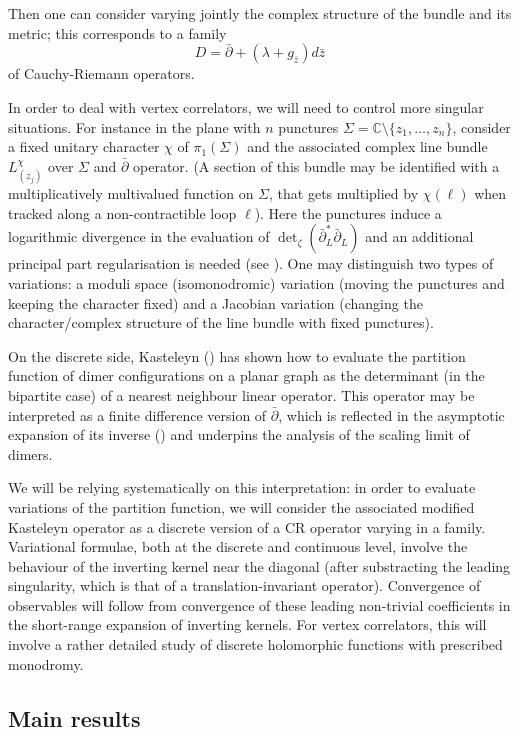 \documentclass[10pt]{article}
\newcommand{\C}{\mathbb{C}}
\newcommand{\dbar}{\bar\partial}
\begin{document}
Then one can consider varying jointly the complex structure of the bundle and its metric; this corresponds to a family
$$D=\dbar+(\lambda+g_{\bar z})d\bar z$$
of Cauchy-Riemann operators. 

In order to deal with vertex correlators, we will need to control more singular situations. For instance in the plane with $n$ punctures $\Sigma=\C\setminus\{z_1,\dots,z_n\}$, consider a fixed unitary character $\chi$ of $\pi_1(\Sigma)$ and the associated complex line bundle $L_{(z_j)}^\chi$ over $\Sigma$ and $\dbar$ operator. (A section of this bundle may be identified with a multiplicatively multivalued function on $\Sigma$, that gets multiplied by $\chi(\ell)$ when tracked along a non-contractible loop $\ell$). 
Here the punctures induce a logarithmic divergence in the evaluation of $\det_\zeta(\dbar_L^*\dbar_L)$ and an additional principal part regularisation is needed (see \cite{Palmer_CR}). One may distinguish two types of variations: a moduli space (isomonodromic) variation (moving the punctures and keeping the character fixed) and a Jacobian variation (changing the character/complex structure of the line bundle with fixed punctures). 

On the discrete side, Kasteleyn (\cite{Kas_square}) has shown how to evaluate the partition function of dimer configurations on a planar graph as the determinant (in the bipartite case) of a nearest neighbour linear operator. This operator may be interpreted as a finite difference version of $\dbar$, which is reflected in the asymptotic expansion of its inverse (\cite{Ken_domino_conformal,Ken_isoradial,KOS}) and underpins the analysis of the scaling limit of dimers.

We will be relying systematically on this interpretation: in order to evaluate variations of the partition function, we will consider the associated modified Kasteleyn operator as a discrete version of a CR operator varying in a family. Variational formulae, both at the discrete and continuous level, involve the behaviour of the inverting kernel near the diagonal (after substracting the leading singularity, which is that of a translation-invariant operator). Convergence of observables will follow from convergence of these leading non-trivial coefficients in the short-range expansion of inverting kernels. For vertex correlators, this will involve a rather detailed study of discrete holomorphic functions with prescribed monodromy.

\subsection{Main results}
\end{document}
